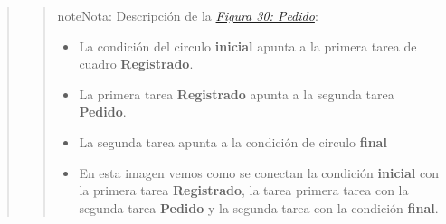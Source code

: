 \documentclass[letterpaper,11pt,spanish]{sphinxmanual}
\begin{document}
\begin{quote}
\begin{quote}
\begin{notice}{note}{Nota:}
Descripción de la {\hyperref[_templates/Contenido6/Parte4:figura30]{\emph{Figura 30: Pedido}}}:
\begin{itemize}
\item {} 
La condición del circulo \textbf{inicial} apunta a la primera tarea de cuadro \textbf{Registrado}.

\item {} 
La primera tarea \textbf{Registrado} apunta a la segunda tarea \textbf{Pedido}.

\item {} 
La segunda tarea apunta a la condición de circulo \textbf{final}

\item {} 
En esta imagen vemos como se conectan la condición  \textbf{inicial} con la primera tarea \textbf{Registrado}, la tarea primera tarea con la segunda tarea \textbf{Pedido} y la segunda tarea con la condición \textbf{final}.

\end{itemize}
\end{notice}
\end{quote}
\end{quote}
\end{document}
